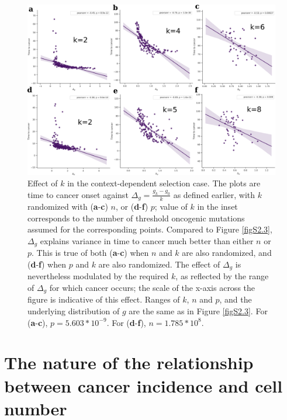 \documentclass[12pt,onecolumn,twoside]{article}
\begin{document}
		\begin{figure}[tbhp]
			\centering
			\includegraphics[width=\linewidth, keepaspectratio=true]{figS2-4.png}
			\caption{Effect of $k$ in the context-dependent selection case. The plots are time to cancer onset against $\Delta_{g} = \frac{g_{k}-g_{0}}{k}$ as defined earlier, with $k$ randomized with (\textbf{a}-\textbf{c}) $n$, or (\textbf{d}-\textbf{f}) $p$; value of $k$ in the inset corresponds to the number of threshold oncogenic mutations assumed for the corresponding points. Compared to Figure \ref{figS2.3}, $\Delta_{g}$ explains variance in time to cancer much better than either $n$ or $p$. This is true of both (\textbf{a}-\textbf{c}) when $n$ and $k$ are also randomized, and (\textbf{d}-\textbf{f}) when $p$ and $k$ are also randomized. The effect of $\Delta_{g}$ is nevertheless modulated by the required $k$, as reflected by the range of $\Delta_{g}$ for which cancer occurs; the scale of the x-axis across the figure is indicative of this effect. Ranges of $k$, $n$ and $p$, and the underlying distribution of $g$ are the same as in Figure \ref{figS2.3}. For (\textbf{a}-\textbf{c}), $p=5.603*10^{-9}$. For (\textbf{d}-\textbf{f}), $n=1.785*10^{8}$.}
			\label{figS2.4}
		\end{figure}

	\section{The nature of the relationship between cancer incidence and cell number}\label{S3 Text}
\end{document}
